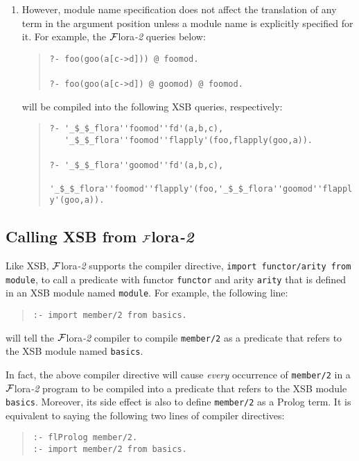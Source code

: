 \documentclass[11pt]{article}
\newcommand{\FLORA}{{\mbox{${\cal F}${\sc lora}\rm\emph{-2}}}\xspace}
\begin{document}
\begin{enumerate}
\item However, module name specification does not affect the translation of
      any term in the argument position unless a module name is explicitly
      specified for it. For example, the \FLORA queries below:
      \begin{quote}
      \verb|?- foo(goo(a[c->d])) @ foomod.| \\
      \\
      \verb|?- foo(goo(a[c->d]) @ goomod) @ foomod.|
      \end{quote}
      will be compiled into the following XSB queries, respectively:
      \begin{quote}
      \verb|?- '_$_$_flora''foomod''fd'(a,b,c),| \\
      \verb|   '_$_$_flora''foomod''flapply'(foo,flapply(goo,a)).| \\
      \\
      \verb|?- '_$_$_flora''goomod''fd'(a,b,c),| \\
      \verb|   '_$_$_flora''foomod''flapply'(foo,'_$_$_flora''goomod''flapply'(goo,a)).|
      \end{quote}
\end{enumerate}


\subsection{Calling XSB from \FLORA}


%
Like XSB, \FLORA supports the compiler directive,
\mbox{\tt import functor/arity from module}, to call a predicate
with functor {\tt functor} and arity {\tt arity} that is defined in an
XSB module named {\tt module}. For example, the following line:
\begin{quote}
\verb|:- import member/2 from basics.|
\end{quote}
will tell the \FLORA compiler to compile {\tt member/2} as a predicate
that refers to the XSB module named {\tt basics}.

In fact, the above compiler directive will cause \emph{every}
occurrence of {\tt member/2} in a \FLORA program to be compiled into a
predicate that refers to the XSB module {\tt basics}. Moreover, its
side effect is also to define {\tt member/2} as a Prolog
term. It is equivalent to saying the following two lines of
compiler directives:
\begin{quote}
\begin{verbatim}
:- flProlog member/2.
:- import member/2 from basics.
\end{verbatim}
\end{quote}
\end{document}
